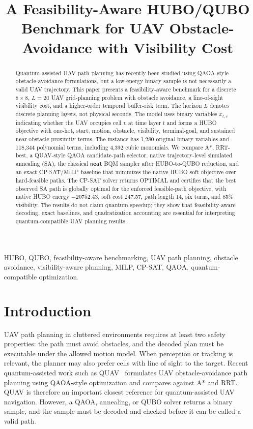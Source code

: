 \documentclass[10pt,conference]{IEEEtran}
\title{A Feasibility-Aware HUBO/QUBO Benchmark for UAV Obstacle-Avoidance with Visibility Cost}
\author{\IEEEauthorblockN{Author names to be finalized}
\IEEEauthorblockA{Affiliations to be finalized\\
Email: to be finalized}}
\begin{document}
\maketitle

\begin{abstract}
Quantum-assisted UAV path planning has recently been studied using QAOA-style obstacle-avoidance formulations, but a low-energy binary sample is not necessarily a valid UAV trajectory. This paper presents a feasibility-aware benchmark for a discrete $8\times8$, $L=20$ UAV grid-planning problem with obstacle avoidance, a line-of-sight visibility cost, and a higher-order temporal buffer-risk term. The horizon $L$ denotes discrete planning layers, not physical seconds. The model uses binary variables $x_{t,v}$ indicating whether the UAV occupies cell $v$ at time layer $t$ and forms a HUBO objective with one-hot, start, motion, obstacle, visibility, terminal-goal, and sustained near-obstacle proximity terms. The instance has 1,280 original binary variables and 118,344 polynomial terms, including 4,392 cubic monomials. We compare A*, RRT-best, a QUAV-style QAOA candidate-path selector, native trajectory-level simulated annealing (SA), the classical \texttt{neal} BQM sampler after HUBO-to-QUBO reduction, and an exact CP-SAT/MILP baseline that minimizes the native HUBO soft objective over hard-feasible paths. The CP-SAT solver returns OPTIMAL and certifies that the best observed SA path is globally optimal for the enforced feasible-path objective, with native HUBO energy $-20752.43$, soft cost 247.57, path length 14, six turns, and 85\% visibility. The results do not claim quantum speedup; they show that feasibility-aware decoding, exact baselines, and quadratization accounting are essential for interpreting quantum-compatible UAV planning results.
\end{abstract}

\begin{IEEEkeywords}
HUBO, QUBO, feasibility-aware benchmarking, UAV path planning, obstacle avoidance, visibility-aware planning, MILP, CP-SAT, QAOA, quantum-compatible optimization.
\end{IEEEkeywords}

\section{Introduction}
UAV path planning in cluttered environments requires at least two safety properties: the path must avoid obstacles, and the decoded plan must be executable under the allowed motion model. When perception or tracking is relevant, the planner may also prefer cells with line of sight to the target. Recent quantum-assisted work such as QUAV~\cite{innan2025quav} formulates UAV obstacle-avoidance path planning using QAOA-style optimization and compares against A* and RRT. QUAV is therefore an important closest reference for quantum-assisted UAV navigation. However, a QAOA, annealing, or QUBO solver returns a binary sample, and the sample must be decoded and checked before it can be called a valid path.
\end{document}
